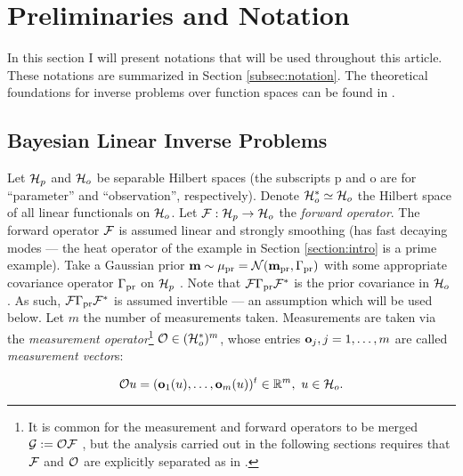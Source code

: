 \section{Preliminaries and Notation}\label{section:prelim}

In this section I will present notations that will be used throughout
this article. These notations are summarized in Section
\ref{subsec:notation}. The theoretical foundations for inverse
problems over function spaces can be found in \cite{Stuart10}.


\subsection{Bayesian Linear Inverse Problems}\label{subsec:abstract OED}
Let $\mathcal{H}_p$ and $\mathcal{H}_o$ be separable Hilbert spaces (the subscripts p
and o are for ``parameter'' and ``observation'', respectively). Denote
$\mathcal{H}_o^* \simeq \mathcal{H}_o$ the Hilbert space of all linear functionals on
$\mathcal{H}_o$. Let $\mathcal{F}: \mathcal{H}_p \to \mathcal{H}_o$ the \emph{forward operator}. The
forward operator $\mathcal{F}$ is assumed linear and strongly smoothing (has
fast decaying modes --- the heat operator of the example in Section
\ref{section:intro} is a prime example). Take a Gaussian prior $\mathbf{m}
\sim \mu_{\textup{pr}} = \mathcal{N}(\mathbf{m}_{\textup{pr}} ,\Gamma_{\textup{pr}})$ with some appropriate covariance
operator $\Gamma_{\textup{pr}}$ on $\mathcal{H}_p$ \cite{Stuart10}. Note that $\mathcal{F} \Gamma_{\textup{pr}}
\mathcal{F}^*$ is the prior covariance in $\mathcal{H}_o$ \cite{Stuart10}. As such,
$\mathcal{F} \Gamma_{\textup{pr}} \mathcal{F}^*$ is assumed invertible --- an assumption which
will be used below. Let $m$ the number of measurements
taken. Measurements are taken via the \emph{measurement
operator}\footnote{It is common for the measurement and forward
operators to be merged $\mathcal{G} := \mathcal{O} \mathcal{F}$
\cite{AlexanderianGloorGhattas14}, but the analysis carried out in the
following sections requires that $\mathcal{F}$ and $\mathcal{O}$ are explicitly
separated as in \cite{attia2022stochastic, cvetkovic2023choosing}.}
$\mathcal{O} \in ( \mathcal{H}_o^* )^m$, whose entries $\mathbf{o}_j, j=1,\dots,m$ are
called \emph{measurement vector}s:

\begin{equation*}%
  \obs u = (\meas_1(u), \dots, \meas_m(u) )^t \in \R^m,\ u \in \hilo.
\end{equation*}
%
%


